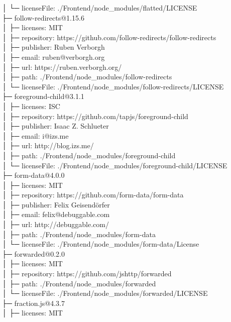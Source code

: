 │  └─ licenseFile: ./Frontend/node\_modules/flatted/LICENSE\\
├─ follow-redirects@1.15.6\\
│  ├─ licenses: MIT\\
│  ├─ repository: https://github.com/follow-redirects/follow-redirects\\
│  ├─ publisher: Ruben Verborgh\\
│  ├─ email: ruben@verborgh.org\\
│  ├─ url: https://ruben.verborgh.org/\\
│  ├─ path: ./Frontend/node\_modules/follow-redirects\\
│  └─ licenseFile: ./Frontend/node\_modules/follow-redirects/LICENSE\\
├─ foreground-child@3.1.1\\
│  ├─ licenses: ISC\\
│  ├─ repository: https://github.com/tapjs/foreground-child\\
│  ├─ publisher: Isaac Z. Schlueter\\
│  ├─ email: i@izs.me\\
│  ├─ url: http://blog.izs.me/\\
│  ├─ path: ./Frontend/node\_modules/foreground-child\\
│  └─ licenseFile: ./Frontend/node\_modules/foreground-child/LICENSE\\
├─ form-data@4.0.0\\
│  ├─ licenses: MIT\\
│  ├─ repository: https://github.com/form-data/form-data\\
│  ├─ publisher: Felix Geisendörfer\\
│  ├─ email: felix@debuggable.com\\
│  ├─ url: http://debuggable.com/\\
│  ├─ path: ./Frontend/node\_modules/form-data\\
│  └─ licenseFile: ./Frontend/node\_modules/form-data/License\\
├─ forwarded@0.2.0\\
│  ├─ licenses: MIT\\
│  ├─ repository: https://github.com/jshttp/forwarded\\
│  ├─ path: ./Frontend/node\_modules/forwarded\\
│  └─ licenseFile: ./Frontend/node\_modules/forwarded/LICENSE\\
├─ fraction.js@4.3.7\\
│  ├─ licenses: MIT\\
